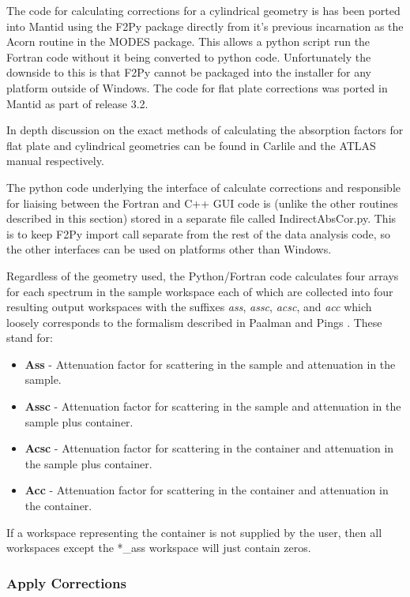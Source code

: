 \documentclass[paper=a4, fontsize=11pt]{scrartcl}	%
\numberwithin{equation}{section}															%
\numberwithin{figure}{section}																%
\numberwithin{table}{section}																%
\begin{document}
The code for calculating corrections for a cylindrical geometry is has been ported into Mantid using the F2Py package directly from it's previous incarnation as the Acorn routine in the MODES package. This allows a python script run the Fortran code without it being converted to python code. Unfortunately the downside to this is that F2Py cannot be packaged into the installer for any platform outside of Windows. The code for flat plate corrections was ported in Mantid as part of release 3.2.

In depth discussion on the exact methods of calculating the absorption factors for flat plate and cylindrical geometries can be found in Carlile \cite{ccarlile1974} and the ATLAS manual \cite{aksoper1989} respectively.

The python code underlying the interface of calculate corrections and responsible for liaising between the Fortran and C++ GUI code is (unlike the other routines described in this section) stored in a separate file called IndirectAbsCor.py. This is to keep F2Py import call separate from the rest of the data analysis code, so the other interfaces can be used on platforms other than Windows.

Regardless of the geometry used, the Python/Fortran code calculates four arrays for each spectrum in the sample workspace each of which are collected into four resulting output workspaces with the suffixes \textit{ass}, \textit{assc}, \textit{acsc}, and \textit{acc} which loosely corresponds to the formalism described in Paalman and Pings \cite{hhpaalman1962}. These stand for:

\begin{itemize}
\item \textbf{Ass} - Attenuation factor for scattering in the sample and attenuation in the sample.
\item \textbf{Assc} - Attenuation factor for scattering in the sample and attenuation in the sample plus container.
\item \textbf{Acsc} - Attenuation factor for scattering in the container and attenuation in the sample plus container.
\item \textbf{Acc} - Attenuation factor for scattering in the container and attenuation in the container.
\end{itemize}

If a workspace representing the container is not supplied by the user, then all workspaces except the \**\_ass workspace will just contain zeros.

\subsubsection{Apply Corrections}
\label{subsubsec:apply-corrections}
\end{document}

